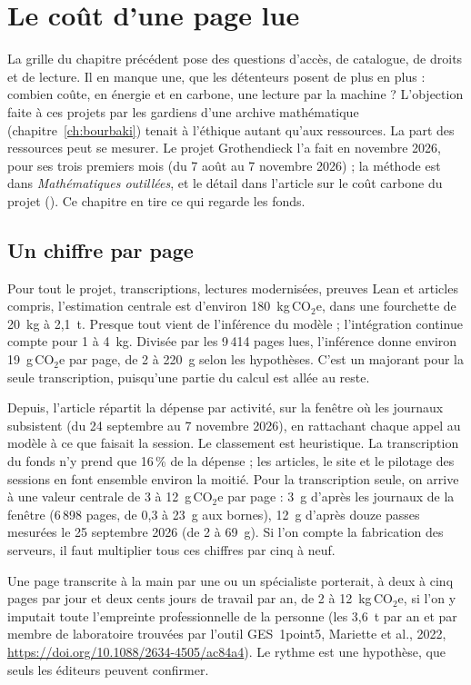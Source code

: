 \chapter{Le coût d'une page lue}\label{ch:cout}

La grille du chapitre précédent pose des questions d'accès, de catalogue, de droits et de
lecture. Il en manque une, que les détenteurs posent de plus en plus : combien coûte, en
énergie et en carbone, une lecture par la machine ? L'objection faite à ces projets par
les gardiens d'une archive mathématique (chapitre~\ref{ch:bourbaki}) tenait à l'éthique
autant qu'aux ressources. La part des ressources peut se mesurer. Le projet Grothendieck
l'a fait en novembre 2026, pour ses trois premiers mois (du 7 août au 7 novembre 2026) ;
la méthode est dans \emph{Mathématiques outillées}, et le détail dans l'article sur le
coût carbone du projet (). Ce chapitre en tire ce qui
regarde les fonds.

\section{Un chiffre par page}

Pour tout le projet, transcriptions, lectures modernisées, preuves Lean et articles
compris, l'estimation centrale est d'environ 180~kg\,CO$_2$e, dans une fourchette de 20~kg
à 2,1~t. Presque tout vient de l'inférence du modèle ; l'intégration continue compte pour
1 à 4~kg. Divisée par les 9\,414 pages lues, l'inférence donne environ 19~g\,CO$_2$e par
page, de 2 à 220~g selon les hypothèses. C'est un majorant pour la seule transcription,
puisqu'une partie du calcul est allée au reste.

Depuis, l'article répartit la dépense par activité, sur la fenêtre où les journaux
subsistent (du 24 septembre au 7 novembre 2026), en rattachant chaque appel au modèle à ce
que faisait la session. Le classement est heuristique. La transcription du fonds n'y prend que 16\,\% de
la dépense ; les articles, le site et le pilotage des sessions en font ensemble environ la
moitié. Pour la transcription seule, on arrive à une valeur centrale de 3 à 12~g\,CO$_2$e
par page : 3~g d'après les journaux de la fenêtre (6\,898 pages, de 0,3 à 23~g aux
bornes), 12~g d'après douze passes mesurées le 25 septembre 2026 (de 2 à 69~g). Si l'on
compte la fabrication des serveurs, il faut multiplier tous ces chiffres par cinq à neuf.

Une page transcrite à la main par une ou un spécialiste porterait, à deux à cinq pages par
jour et deux cents jours de travail par an, de 2 à 12~kg\,CO$_2$e, si l'on y imputait toute
l'empreinte professionnelle de la personne (les 3,6~t par an et par membre de laboratoire
trouvées par l'outil GES~1point5, Mariette et al., 2022,
\url{https://doi.org/10.1088/2634-4505/ac84a4}). Le rythme est une hypothèse, que seuls les
éditeurs peuvent confirmer.

